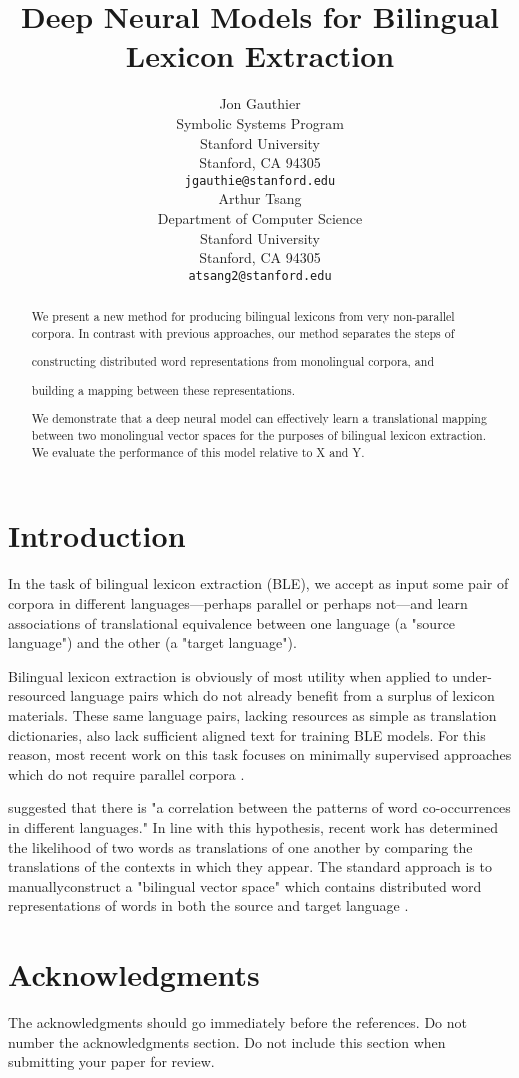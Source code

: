 \documentclass[11pt]{article}
\title{Deep Neural Models for Bilingual Lexicon Extraction}
\author{Jon Gauthier \\
  Symbolic Systems Program \\
  Stanford University \\
  Stanford, CA 94305 \\
  {\tt jgauthie@stanford.edu} \\\And
  Arthur Tsang \\
  Department of Computer Science \\
  Stanford University \\
  Stanford, CA 94305 \\
  {\tt atsang2@stanford.edu} \\}
\date{}
\begin{document}
\maketitle

\begin{abstract}
  We present a new method for producing bilingual lexicons from very
  non-parallel corpora. In contrast with previous approaches, our method
  separates the steps of \begin{inparaenum}[(1)]
    \item constructing distributed word representations from monolingual
      corpora, and
    \item building a mapping between these representations.
  \end{inparaenum}
  
  We demonstrate that a deep neural model can effectively learn a translational
  mapping between two monolingual vector spaces for the purposes of bilingual
  lexicon extraction. We evaluate the performance of this model relative to X
  and Y.
\end{abstract}

\section{Introduction}

In the task of bilingual lexicon extraction (BLE), we accept as input some pair
of corpora in different languages---perhaps parallel or perhaps not---and learn
associations of translational equivalence between one language (a "source
language") and the other (a "target language").

Bilingual lexicon extraction is obviously of most utility when applied to
under-resourced language pairs which do not already benefit from a surplus of
lexicon materials. These same language pairs, lacking resources as simple as
translation dictionaries, also lack sufficient aligned text for training
BLE models. For this reason, most recent work on this task focuses on
minimally supervised approaches which do not require parallel corpora
\cite{rapp1995,peirsman2010}.

 suggested that there is "a correlation between the patterns
of word co-occurrences in different languages." In line with this hypothesis,
recent work has determined the likelihood of two words as translations of one
another by comparing the translations of the contexts in which they appear. The
standard approach is to manually\unclear construct a "bilingual vector space" which
contains distributed word representations of words in both the source and target
language \cite{fung1998,peirsman2010,vulic2013}.

\section*{Acknowledgments}

The acknowledgments should go immediately before the references.  Do
not number the acknowledgments section. Do not include this section
when submitting your paper for review.



\end{document}
